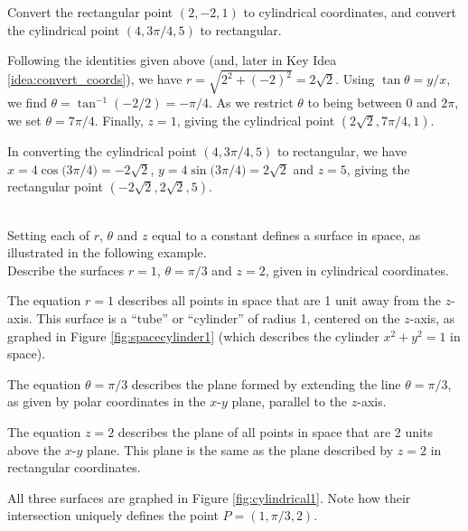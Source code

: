 {Convert the rectangular point $(2,-2,1)$ to cylindrical coordinates, and convert the cylindrical point $(4,3\pi/4,5)$ to rectangular.
}
{Following the identities given above (and, later in Key Idea \ref{idea:convert_coords}), we have $r = \sqrt{2^2+(-2)^2} = 2\sqrt{2}$. Using $\tan\theta = y/x$, we find $\theta = \tan^{-1}(-2/2) =-\pi/4$. As we restrict $\theta$ to being between $0$ and $2\pi$, we set $\theta = 7\pi/4$. Finally, $z = 1$, giving the cylindrical point $(2\sqrt2,7\pi/4,1)$.

In converting the cylindrical point $(4,3\pi/4,5)$ to rectangular, we have
$x = 4\cos\big(3\pi/4\big) = -2\sqrt{2}$, $y = 4\sin\big(3\pi/4\big) = 2\sqrt{2}$ and $z=5$, giving the rectangular point $(-2\sqrt{2},2\sqrt{2},5)$.
}\\

Setting each of $r$, $\theta$ and $z$ equal to a constant defines a surface in space, as illustrated in the following example.\\

%
{Describe the surfaces $r=1$, $\theta = \pi/3$ and $z=2$, given in cylindrical coordinates.
}
{The equation $r=1$ describes all points in space that are 1 unit away from the $z$-axis. This surface is a ``tube'' or ``cylinder'' of radius 1, centered on the $z$-axis, as graphed in Figure \ref{fig:spacecylinder1} (which describes the cylinder $x^2+y^2=1$ in space). 

The equation $\theta=\pi/3$ describes the plane formed by extending the line $\theta=\pi/3$, as given by polar coordinates in the $x$-$y$ plane, parallel to the $z$-axis.

The equation $z=2$ describes the plane of all points in space that are 2 units above the $x$-$y$ plane. This plane is the same as the plane described by $z=2$ in rectangular coordinates.

All three surfaces are graphed in Figure \ref{fig:cylindrical1}. Note how their intersection uniquely defines the point $P=(1,\pi/3,2)$.
}\\

